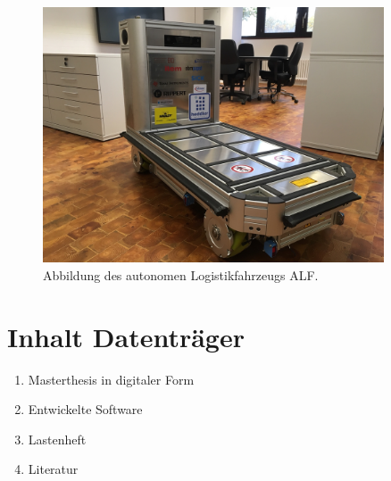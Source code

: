 \documentclass[12pt,a4paper,oneside,numbers=noenddot,headsepline,captions=tableheading,toc=bibliography,openany,tikz,margin=5mm]{scrbook}
\begin{document}
\begin{appendix}
\begin{table}[H]
\begin{center}
\begin{tabular}{|m{}<{\centering}|m{}<{\centering}|}
								
								\hline
							\end{tabular}
						\end{center}
						
						\label{fig: knotenmengen}
					\end{table}
				
				
					\begin{figure}[H]
						\centering
						\includegraphics[angle=90,width=0.9\textwidth]{Bilder/Bild.jpeg}
						\caption{Abbildung des autonomen Logistikfahrzeugs ALF.}
						\label{fig: Wirkstruktur Schlupfregelung}
					\end{figure}
					
				
				
				
					\newpage 
					
				
					
					\section{Inhalt Datenträger} 
					\label{dataCD}
					\begin{enumerate}[label=\textbf{\arabic*},ref=A.1.\arabic*]
						\item Masterthesis in digitaler Form
						\label{it: dig}
						\item Entwickelte Software
						\label{it: Software}
						\item Lastenheft
						\label{it: Lastenheft}
						\item Literatur
						
					\end{enumerate}
				
		
	\end{appendix}
	
	
\end{document}

